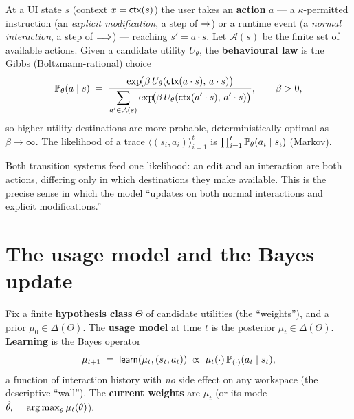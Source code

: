 \documentclass[../uxoxo-main]{subfiles}
\begin{document}
\begin{definition}\label{def:obs}
At a UI state $s$ (context $x=\mathsf{ctx}(s)$) the user takes an \textbf{action} $a$ ---
a $\kappa$-permitted instruction (an \emph{explicit modification}, a step of
$\xrightarrow{\,\,}$) or a runtime event (a \emph{normal interaction}, a step of
$\overset{}{\Longrightarrow}$) --- reaching $s'=a\cdot s$. Let $\mathcal A(s)$ be the finite set of
available actions. Given a candidate utility $U_\theta$, the
\textbf{behavioural law} is the Gibbs (Boltzmann-rational) choice
\[
  \mathbb{P}_\theta(a\mid s)\;=\;
  \frac{\exp\!\bigl(\beta\,U_\theta(\mathsf{ctx}(a\cdot s),\,a\cdot s)\bigr)}
       {\displaystyle\sum_{a'\in\mathcal A(s)}\exp\!\bigl(\beta\,U_\theta(\mathsf{ctx}(a'\cdot s),\,a'\cdot s)\bigr)},
  \qquad\beta>0,
\]
so higher-utility destinations are more probable, deterministically optimal as
$\beta\to\infty$. The likelihood of a trace $\langle(s_i,a_i)\rangle_{i=1}^{t}$
is $\prod_{i=1}^{t}\mathbb{P}_\theta(a_i\mid s_i)$ (Markov).
\end{definition}

Both transition systems feed one likelihood: an edit and an interaction are both
actions, differing only in which destinations they make available. This is the
precise sense in which the model ``updates on both normal interactions and
explicit modifications.''

\section{The usage model and the Bayes update}\label{sec:bayes}
\begin{definition}\label{def:usage}
Fix a finite \textbf{hypothesis class} $\Theta$ of candidate utilities (the
``weights''), and a prior $\mu_0\in\Delta(\Theta)$. The \textbf{usage model} at
time $t$ is the posterior $\mu_t\in\Delta(\Theta)$. \textbf{Learning} is the
Bayes operator
\[
  \mu_{t+1}\;=\;\mathsf{learn}(\mu_t,(s_t,a_t))\;\propto\;
  \mu_t(\cdot)\,\mathbb{P}_{(\cdot)}(a_t\mid s_t),
\]
a function of interaction history with \emph{no} side effect on any workspace
(the descriptive ``wall''). The \textbf{current weights} are $\mu_t$ (or its mode
$\hat\theta_t=\operatorname*{arg\,max}_\theta\mu_t(\theta)$).
\end{definition}
\end{document}
